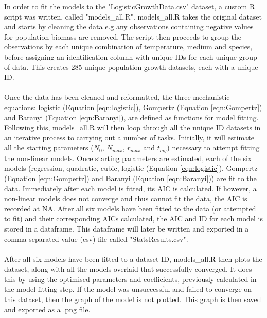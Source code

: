 \documentclass[11pt, a4paper]{article} %
\begin{document}
In order to fit the models to the "LogisticGrowthData.csv" dataset, a custom R script was written, called "models\_all.R". models\_all.R takes the original dataset and starts by cleaning the data e.g any observations containing negative values for population biomass are removed. The script then proceeds to group the observations by each unique combination of temperature, medium and species, before assigning an identification column with unique IDs for each unique group of data. This creates 285 unique population growth datasets, each with a unique ID. 
\paragraph{} Once the data has been cleaned and reformatted, the three mechanistic equations: logistic (Equation \ref{eqn:logistic}), Gompertz (Equation \ref{eqn:Gompertz}) and Baranyi (Equation \ref{eqn:Baranyi}), are defined as functions for model fitting. Following this, models\_all.R will then loop through all the unique ID datasets in an iterative process to carrying out a number of tasks. Initially, it will estimate all the starting parameters ($N_0$, $N_{max}$, $r_{max}$ and $t_{lag}$) necessary to attempt fitting the non-linear models. Once starting parameters are estimated, each of the six models (regression, quadratic, cubic, logistic (Equation \ref{eqn:logistic}), Gompertz (Equation \ref{eqn:Gompertz}) and Baranyi (Equation \ref{eqn:Baranyi})) are fit to the data. Immediately after each model is fitted, its AIC is calculated. If however, a non-linear models does not converge and thus cannot fit the data, the AIC is recorded at NA. After all six models have been fitted to the data (or attempted to fit) and their corresponding AICs calculated, the AIC and ID for each model is stored in a dataframe. This dataframe will later be written and exported in a comma separated value (csv) file called "StatsResults.csv".
\paragraph{} After all six models have been fitted to a dataset ID,  models\_all.R then plots the dataset, along with all the models overlaid that successfully converged. It does this by using the optimised parameters and coefficients, previously calculated in the model fitting step. If the model was unsuccessful and failed to converge on this dataset, then the graph of the model is not plotted. This graph is then saved and exported as a .png file.
\end{document}
